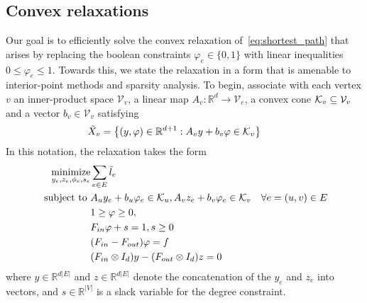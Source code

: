 \documentclass[letterpaper, 11pt]{article}
\begin{document}
\subsection{Convex relaxations}
Our goal is to efficiently solve the convex relaxation of~\eqref{eq:shortest_path}
that arises by replacing the boolean constraints $\varphi_e \in \{0, 1\}$ 
with linear inequalities $0 \le \varphi_e \le 1$. Towards this, we
state the relaxation in a form that is amenable to interior-point methods and sparsity 
analysis.   To begin, associate with each vertex $v$  an inner-product space $\mathcal{V}_v$,
a linear map $A_v : \mathbb{R}^{d} \rightarrow \mathcal{V}_e$, a
convex cone $\mathcal{K}_v \subseteq \mathcal{V}_v$ and a vector $b_v \in \mathcal{V}_v$ satisfying
\[
  \tilde X_v = \left\{ (y, \varphi) \in \mathbb{R}^{d+1} : A_v y  + b_v \varphi \in \mathcal{K}_v  \right\} \qquad
\]
In this notation, the relaxation takes the form
\begin{align}~\label{cp:coneRelax}
  \begin{aligned}
    \operatorname*{minimize}_{y_e, z_e, \phi_e, s_e} & \sum_{e \in E}\tilde l_e\\
    \mbox{subject to } &A_u y_e + b_u \varphi_e \in \mathcal{K}_u ,  A_v z_e + b_v \varphi_e \in \mathcal{K}_v  & \forall e = (u, v) \in E \\
                      & 1 \ge \varphi \ge 0,  \\
                      & F_{in} \varphi  + s   = 1, s \ge 0\\
                      & (F_{in} - F_{out}) \varphi  = f\\
                      & (F_{in} \otimes I_d)  y - (F_{out} \otimes I_d) z  = 0\\
  \end{aligned}
\end{align}
where $y \in \mathbb{R}^{ d |E|} $ and $z \in \mathbb{R}^{ d |E|}$ denote the concatenation of the $y_e$ and $z_e$
into vectors, and $s \in \mathbb{R}^{|V|}$ is a slack variable for the degree constraint. 
\end{document}
